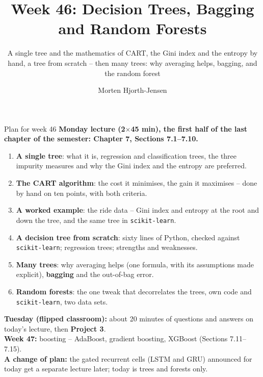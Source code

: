 \documentclass[10pt,aspectratio=169]{beamer}
\title{Week 46: Decision Trees, Bagging and Random Forests}
\subtitle{A single tree and the mathematics of CART, the Gini index and the
  entropy by hand, a tree from scratch -- then many trees: why averaging
  helps, bagging, and the random forest}
\author{Morten Hjorth-Jensen}
\institute{Department of Physics and Center for Computing in Science Education,\\
  University of Oslo, Norway}
\date{}
\begin{document}
\begin{frame}
\titlepage
\end{frame}

\begin{frame}{Plan for week 46}
\footnotesize
\textbf{Monday lecture (2$\times$45 min), the first half of the last chapter
of the semester: Chapter 7, Sections 7.1--7.10.}
\begin{enumerate}
  \item \textbf{A single tree}: what it is, regression and classification
        trees, the three impurity measures and why the Gini index and the
        entropy are preferred.
  \item \textbf{The CART algorithm}: the cost it minimises, the gain it
        maximises -- done by hand on ten points, with both criteria.
  \item \textbf{A worked example}: the ride data -- Gini index and entropy at
        the root and down the tree, and the same tree in \texttt{scikit-learn}.
  \item \textbf{A decision tree from scratch}: sixty lines of Python,
        checked against \texttt{scikit-learn}; regression trees; strengths and
        weaknesses.
  \item \textbf{Many trees}: why averaging helps (one formula, with its
        assumptions made explicit), \textbf{bagging} and the out-of-bag error.
  \item \textbf{Random forests}: the one tweak that decorrelates the trees, own
        code and \texttt{scikit-learn}, two data sets.
\end{enumerate}
\textbf{Tuesday (flipped classroom):} about 20 minutes of questions and answers
on today's lecture, then \textbf{Project 3}.\\[2pt]
\textbf{Week 47:} boosting -- AdaBoost, gradient boosting, XGBoost (Sections
7.11--7.15).\\[2pt]
\textbf{A change of plan:} the gated recurrent cells (LSTM and GRU) announced
for today get a separate lecture later; today is trees and forests only.
\end{frame}
\end{document}
